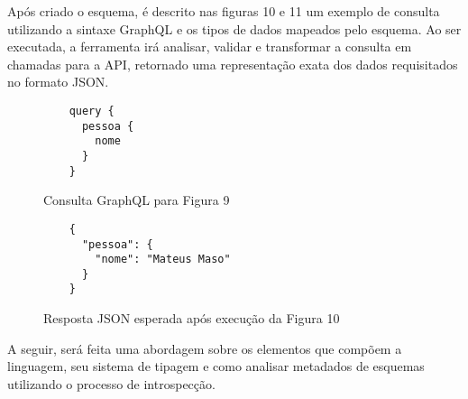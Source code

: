 Após criado o esquema, é descrito nas figuras 10 e 11 um exemplo de consulta utilizando a sintaxe GraphQL e os tipos de dados mapeados pelo esquema. Ao ser executada, a ferramenta irá analisar, validar e transformar a consulta em chamadas para a API, retornado uma representação exata dos dados requisitados no formato JSON. \cite{Facebook2016}

\begin{figure}[H]
  \centering
  \begin{verbatim}
    query {
      pessoa {
        nome
      }
    }
  \end{verbatim}
  \caption{Consulta GraphQL para Figura 9}
\end{figure}

\begin{figure}[H]
  \centering
  \begin{verbatim}
    {
      "pessoa": {
        "nome": "Mateus Maso"
      }
    }
  \end{verbatim}
  \caption{Resposta JSON esperada após execução da Figura 10}
\end{figure}

A seguir, será feita uma abordagem sobre os elementos que compõem a linguagem, seu sistema de tipagem e como analisar metadados de esquemas utilizando o processo de introspecção.




